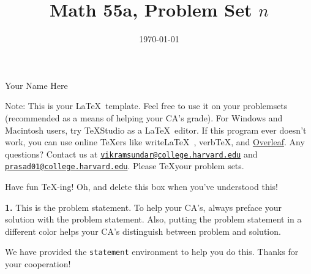 \documentclass[12pt]{amsart}
\title{Math 55a, Problem Set $n$} %
\date{\today}
\newenvironment{statement}[1]{\smallskip\noindent\color[rgb]{.6627, .3529, .6314} {\bf #1.}}{}
\theoremstyle{definition}
\theoremstyle{remark}
\begin{document}
\maketitle

\vspace*{-0.25in}
\centerline{Your Name Here}

\begin{framed}
  Note: This is your \LaTeX~template. Feel free to use it on your problemsets (recommended as a means of helping your CA's grade). For Windows and Macintosh users, try {\TeX}Studio as a \LaTeX~editor. If this program ever doesn't work, you can use online {\TeX}ers like write\LaTeX~, verb\TeX, and \href{http://www.overleaf.com}{Overleaf}. Any questions? Contact us at \href{mailto:vikramsundar@college.harvard.edu}{{\tt vikramsundar@college.harvard.edu}} and \href{mailto:prasad01@college.harvard.edu}{{\tt prasad01@college.harvard.edu}}. Please \TeX your problem sets.

    Have fun \TeX-ing! Oh, and delete this box when you've understood this!
\end{framed}

\begin{statement}{1}
    This is the problem statement. To help your CA's, always preface your solution with the problem statement. Also, putting the problem statement in a different color helps your CA's distinguish between problem and solution. 

    We have provided the {\tt statement} environment to help you do this. Thanks for your cooperation!
\end{statement}
\end{document}
